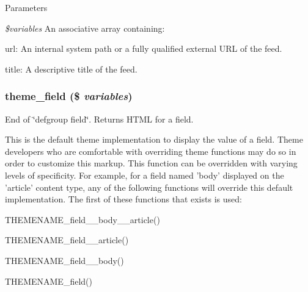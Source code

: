 \begin{DoxyParams}{Parameters}
\item[{\em \$variables}]An associative array containing:
\begin{DoxyItemize}
\item url: An internal system path or a fully qualified external URL of the feed.
\item title: A descriptive title of the feed. 
\end{DoxyItemize}\end{DoxyParams}
\hypertarget{group__themeable_gaee35966f09683ab054aef8f6fd022d2c}{
\subsubsection[{theme\_\-field}]{\setlength{\rightskip}{0pt plus 5cm}theme\_\-field (\$ {\em variables})}}
\label{group__themeable_gaee35966f09683ab054aef8f6fd022d2c}
End of \char`\"{}defgroup field\char`\"{}. Returns HTML for a field.

This is the default theme implementation to display the value of a field. Theme developers who are comfortable with overriding theme functions may do so in order to customize this markup. This function can be overridden with varying levels of specificity. For example, for a field named 'body' displayed on the 'article' content type, any of the following functions will override this default implementation. The first of these functions that exists is used:
\begin{DoxyItemize}
\item THEMENAME\_\-field\_\-\_\-body\_\-\_\-article()
\item THEMENAME\_\-field\_\-\_\-article()
\item THEMENAME\_\-field\_\-\_\-body()
\item THEMENAME\_\-field()
\end{DoxyItemize}

